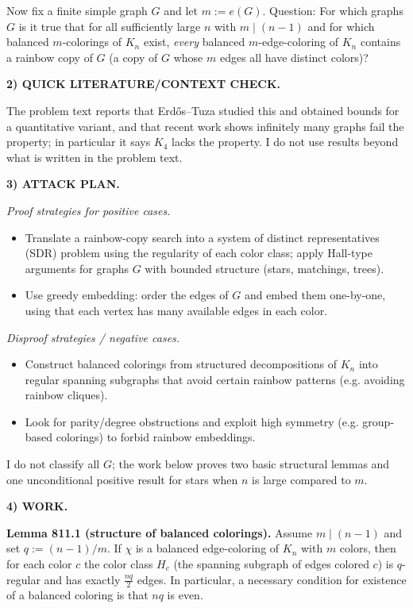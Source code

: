 \smallskip
Now fix a finite simple graph $G$ and let $m:=e(G)$.
Question: For which graphs $G$ is it true that for all sufficiently large $n$ with $m\mid (n-1)$ and for which balanced $m$-colorings of $K_n$ exist, \emph{every} balanced $m$-edge-coloring of $K_n$ contains a rainbow copy of $G$ (a copy of $G$ whose $m$ edges all have distinct colors)?

\medskip
\noindent\textbf{2) QUICK LITERATURE/CONTEXT CHECK.}

The problem text reports that Erd\H{o}s--Tuza studied this and obtained bounds for a quantitative variant, and that recent work shows infinitely many graphs fail the property; in particular it says $K_4$ lacks the property. I do not use results beyond what is written in the problem text.

\medskip
\noindent\textbf{3) ATTACK PLAN.}

\emph{Proof strategies for positive cases.}
\begin{itemize}
\item Translate a rainbow-copy search into a system of distinct representatives (SDR) problem using the regularity of each color class; apply Hall-type arguments for graphs $G$ with bounded structure (stars, matchings, trees).
\item Use greedy embedding: order the edges of $G$ and embed them one-by-one, using that each vertex has many available edges in each color.
\end{itemize}

\emph{Disproof strategies / negative cases.}
\begin{itemize}
\item Construct balanced colorings from structured decompositions of $K_n$ into regular spanning subgraphs that avoid certain rainbow patterns (e.g. avoiding rainbow cliques).
\item Look for parity/degree obstructions and exploit high symmetry (e.g. group-based colorings) to forbid rainbow embeddings.
\end{itemize}

I do not classify all $G$; the work below proves two basic structural lemmas and one unconditional positive result for stars when $n$ is large compared to $m$.

\medskip
\noindent\textbf{4) WORK.}

\textbf{Lemma 811.1 (structure of balanced colorings).}
Assume $m\mid (n-1)$ and set $q:=(n-1)/m$. If $\chi$ is a balanced edge-coloring of $K_n$ with $m$ colors, then for each color $c$ the color class $H_c$ (the spanning subgraph of edges colored $c$) is $q$-regular and has exactly $\frac{nq}{2}$ edges. In particular, a necessary condition for existence of a balanced coloring is that $nq$ is even.

